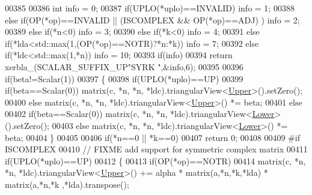 \begin{DoxyCode}
00385 
00386   \textcolor{keywordtype}{int} info = 0;
00387   \textcolor{keywordflow}{if}(UPLO(*uplo)==INVALID)                                            info = 1;
00388   \textcolor{keywordflow}{else} \textcolor{keywordflow}{if}(OP(*op)==INVALID || (ISCOMPLEX && OP(*op)==ADJ) )           info = 2;
00389   \textcolor{keywordflow}{else} \textcolor{keywordflow}{if}(*n<0)                                                       info = 3;
00390   \textcolor{keywordflow}{else} \textcolor{keywordflow}{if}(*k<0)                                                       info = 4;
00391   \textcolor{keywordflow}{else} \textcolor{keywordflow}{if}(*lda<std::max(1,(OP(*op)==NOTR)?*n:*k))                     info = 7;
00392   \textcolor{keywordflow}{else} \textcolor{keywordflow}{if}(*ldc<std::max(1,*n))                                        info = 10;
00393   \textcolor{keywordflow}{if}(info)
00394     \textcolor{keywordflow}{return} xerbla\_(SCALAR\_SUFFIX\_UP\textcolor{stringliteral}{"SYRK "},&info,6);
00395 
00396   \textcolor{keywordflow}{if}(beta!=Scalar(1))
00397   \{
00398     \textcolor{keywordflow}{if}(UPLO(*uplo)==UP)
00399       \textcolor{keywordflow}{if}(beta==Scalar(0)) matrix(c, *n, *n, *ldc).triangularView<\hyperlink{group__enums_gga39e3366ff5554d731e7dc8bb642f83cda6bcb58be3b8b8ec84859ce0c5ac0aaec}{Upper}>().setZero();
00400       \textcolor{keywordflow}{else}                matrix(c, *n, *n, *ldc).triangularView<\hyperlink{group__enums_gga39e3366ff5554d731e7dc8bb642f83cda6bcb58be3b8b8ec84859ce0c5ac0aaec}{Upper}>() *= beta;
00401     \textcolor{keywordflow}{else}
00402       \textcolor{keywordflow}{if}(beta==Scalar(0)) matrix(c, *n, *n, *ldc).triangularView<\hyperlink{group__enums_gga39e3366ff5554d731e7dc8bb642f83cda891792b8ed394f7607ab16dd716f60e6}{Lower}>().setZero();
00403       \textcolor{keywordflow}{else}                matrix(c, *n, *n, *ldc).triangularView<\hyperlink{group__enums_gga39e3366ff5554d731e7dc8bb642f83cda891792b8ed394f7607ab16dd716f60e6}{Lower}>() *= beta;
00404   \}
00405 
00406   \textcolor{keywordflow}{if}(*n==0 || *k==0)
00407     \textcolor{keywordflow}{return} 0;
00408 
00409 \textcolor{preprocessor}{  #if ISCOMPLEX}
00410   \textcolor{comment}{// FIXME add support for symmetric complex matrix}
00411   \textcolor{keywordflow}{if}(UPLO(*uplo)==UP)
00412   \{
00413     \textcolor{keywordflow}{if}(OP(*op)==NOTR)
00414       matrix(c, *n, *n, *ldc).triangularView<\hyperlink{group__enums_gga39e3366ff5554d731e7dc8bb642f83cda6bcb58be3b8b8ec84859ce0c5ac0aaec}{Upper}>() += alpha * matrix(a,*n,*k,*lda) * matrix(a,*n,*k
      ,*lda).transpose();

\end{DoxyCode}
